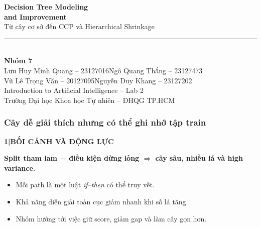 \documentclass[aspectratio=169,12pt]{beamer}
\newcommand{\chaptertag}[2]{%
  \vspace{-0.16cm}%
  {\scriptsize\bfseries\textcolor{boxframe}{#1\enspace |\enspace #2}}\par
  \vspace{0.12cm}%
}
\newcommand{\groupname}{Nhóm 7}
\newcommand{\memberone}{Lưu Huy Minh Quang -- 23127016}
\newcommand{\membertwo}{Ngô Quang Thắng -- 23127473}
\newcommand{\memberthree}{Vũ Lê Trọng Văn -- 20127095}
\newcommand{\memberfour}{Nguyễn Duy Khang -- 23127202}
\begin{document}
\begin{frame}[plain]
  \begin{center}
    \vspace{0.35cm}
    {\LARGE\bfseries\textcolor{primaryblue}{Decision Tree Modeling}}\\[0.08cm]
    {\LARGE\bfseries\textcolor{primaryblue}{and Improvement}}\\[0.35cm]
    {\large Từ cây cơ sở đến CCP và Hierarchical Shrinkage}\\[0.55cm]
    {\color{primaryblue}\rule{0.74\textwidth}{1.2pt}}\\[0.52cm]
    {\normalsize\textbf{\groupname}}\\[0.18cm]
    {\small \memberone \quad \membertwo}\\[0.08cm]
    {\small \memberthree \quad \memberfour}\\[0.48cm]
    {\small Introduction to Artificial Intelligence -- Lab 2}\\[0.08cm]
    {\scriptsize Trường Đại học Khoa học Tự nhiên -- ĐHQG TP.HCM}
  \end{center}
\end{frame}

\begin{frame}
  \frametitle{Cây dễ giải thích nhưng có thể ghi nhớ tập train}
  \chaptertag{1}{BỐI CẢNH VÀ ĐỘNG LỰC}
  \begin{tcolorbox}[riskbox,width=0.90\textwidth,top=3mm,bottom=3mm]
    \centering\Large\bfseries
    Split tham lam + điều kiện dừng lỏng $\Rightarrow$ cây sâu, nhiều lá và high variance.
  \end{tcolorbox}
  \vspace{0.40cm}
  \begin{itemize}
    \item Mỗi path là một luật \textit{if--then} có thể truy vết.
    \item Khả năng diễn giải toàn cục giảm nhanh khi số lá tăng.
    \item Nhóm hướng tới việc giữ score, giảm gap và làm cây gọn hơn.
  \end{itemize}
\end{frame}
\end{document}
